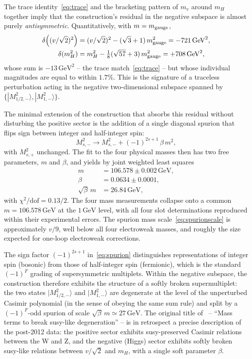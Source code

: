 \documentclass[twocolumn,aps,prd,floatfix,nofootinbib,superscriptaddress,10pt]{article}
\newcommand{\mH}{m_H}
\newcommand{\GeV}{\,\mathrm{GeV}}
\begin{document}
The trace identity~\eqref{eq:trace} and the bracketing pattern of $m_v$ around $m_H$ together imply that the construction's residual in the negative subspace is almost purely {\em antisymmetric}. Quantitatively, with $m=m_{\rm gauge}$,
\begin{align}
\delta\!\left((v/\sqrt{2})^2\right) &= (v/\sqrt{2})^2 - (\sqrt{3}+1)\,m_{\rm gauge}^2 = -721\GeV^2,\\
\delta(\mH^2) &= \mH^2 - \tfrac{1}{8}(\sqrt{57}+3)\,m_{\rm gauge}^2 = +708\GeV^2,
\end{align}
whose sum is $-13\GeV^2$ -- the trace match~\eqref{eq:trace} -- but whose individual magnitudes are equal to within $1.7\%$. This is the signature of a traceless perturbation acting in the negative two-dimensional subspace spanned by $\{|M^2_{1/2,-}\rangle,|M^2_{1,-}\rangle\}$.

The minimal extension of the construction that absorbs this residual without disturbing the positive sector is the addition of a single diagonal spurion that flips sign between integer and half-integer spin:
\begin{equation}
M^2_{s,-} \rightarrow M^2_{s,-} + (-1)^{2s+1}\,\beta\,m^2,
\label{eq:spurion}
\end{equation}
with $M^2_{s,+}$ unchanged. The fit to the four physical masses then has two free parameters, $m$ and $\beta$, and yields by joint weighted least squares
\begin{align}
m &= 106.578\pm 0.002\GeV, \label{eq:mfit}\\
\beta &= 0.0634\pm 0.0001, \label{eq:betafit}\\
\sqrt{\beta}\,m &= 26.84\GeV, \label{eq:spurionscale}
\end{align}
with $\chi^2/\mathrm{dof}=0.13/2$. The four mass measurements collapse onto a common $m=106.578\GeV$ at the $1\GeV$ level, with all four slot determinations reproduced within their experimental errors. The spurion mass scale~\eqref{eq:spurionscale} is approximately $v/9$, well below all four electroweak masses, and roughly the size expected for one-loop electroweak corrections.

The sign factor $(-1)^{2s+1}$ in~\eqref{eq:spurion} distinguishes representations of integer spin (bosonic) from those of half-integer spin (fermionic), which is the standard $(-1)^F$ grading of supersymmetric multiplets. Within the negative subspace, the construction therefore exhibits the structure of a softly broken supermultiplet: the two states $|M^2_{1/2,-}\rangle$ and $|M^2_{1,-}\rangle$ are degenerate at the level of the unperturbed Casimir polynomial (in the sense of obeying the same sum rule) and split by a $(-1)^F$-odd spurion of scale $\sqrt{\beta}\,m\simeq 27\GeV$. The original title of~\cite{Rivero2006} -- ``Mass terms to break susy-like degeneration'' -- is in retrospect a precise description of the post-2012 data: the positive sector exhibits susy-preserved Casimir relations between the W and Z, and the negative (Higgs) sector exhibits softly broken susy-like relations between $v/\sqrt{2}$ and $\mH$, with a single soft parameter $\beta$.
\end{document}
